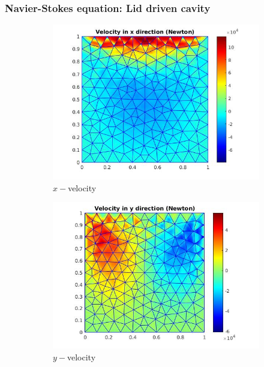 \documentclass{beamer}
\begin{document}
\begin{frame}
\frametitle{Navier-Stokes equation: Lid driven cavity}
\begin{figure}
  \begin{subfigure}{0.3\textwidth}
    \includegraphics[width=\linewidth]{lid_newton_vx_schur.jpg}
    \caption{$x-$velocity}
  \label{x_vel_navier_stoke_schur_lid}
  \end{subfigure}
  \begin{subfigure}{0.3\textwidth}
    \includegraphics[width=\linewidth]{lid_newton_vy_schur.jpg}
    \caption{$y-$velocity}
  \label{y_vel_navier_stoke_schur_lid}
  \end{subfigure}
  \begin{subfigure}{0.3\textwidth}

\end{subfigure}
\end{figure}
\end{frame}
\end{document}
